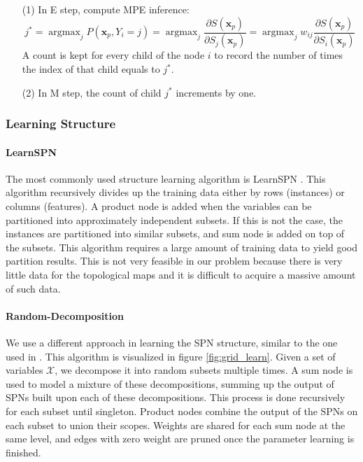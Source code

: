 \documentclass[10pt, titlepage]{article}
\theoremstyle{definition}
\newcommand\mb{\mathbf}
\DeclareMathOperator*{\argmax}{argmax}
\begin{document}
\begin{enumerate}
    \item[(1)] In E step, compute MPE inference:
        \begin{equation}
        j^*=\argmax_j P(\mb{x}_p, Y_i=j)=\argmax_j\frac{\partial S(\mb{x}_p)}{\partial S_j(\mb{x}_p)}=\argmax_j w_{ij}\frac{\partial S(\mb{x}_p)}{\partial S_i(\mb{x}_p)}
        \end{equation}
        A count is kept for every child of the node $i$ to record the number of times the index of that child equals to $j^*$.
        
    \item[(2)] In M step, the count of child $j^*$ increments by one.
\end{enumerate}

\subsubsection{Learning Structure}

\paragraph{LearnSPN}
The most commonly used structure learning algorithm is LearnSPN \cite{gens2013learning}. This algorithm recursively divides up the training data either by rows (instances) or columns (features). A product node is added when the variables can be partitioned into approximately independent subsets. If this is not the case, the instances are partitioned into similar subsets, and sum node is added on top of the subsets. This algorithm requires a large amount of training data to yield good partition results. This is not very feasible in our problem because there is very little data for the topological maps and it is difficult to acquire a massive amount of such data.

\paragraph{Random-Decomposition}\label{sc:rand}
We use a different approach in learning the SPN structure, similar to the one used in \cite{pronobis2016learning}. This algorithm is visualized in figure \ref{fig:grid_learn}. Given a set of variables $\mathcal{X}$, we decompose it into random subsets multiple times. A sum node is used to model a mixture of these decompositions, summing up the output of SPNs built upon each of these decompositions. This process is done recursively for each subset until singleton. Product nodes combine the output of the SPNs on each subset to union their scopes. Weights are shared for each sum node at the same level, and edges with zero weight are pruned once the parameter learning is finished.
\end{document}
